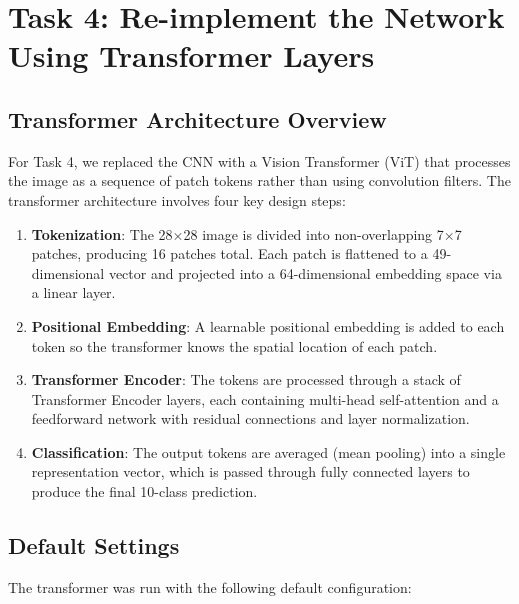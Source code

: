\documentclass[11pt]{article}
\begin{document}
\section{Task 4: Re-implement the Network Using Transformer Layers}


\subsection{Transformer Architecture Overview}

For Task 4, we replaced the CNN with a Vision Transformer (ViT) that processes the image as a sequence of patch tokens rather than using convolution filters. The transformer architecture involves four key design steps:

\begin{enumerate}
    \item \textbf{Tokenization}: The 28$\times$28 image is divided into non-overlapping 7$\times$7 patches, producing 16 patches total. Each patch is flattened to a 49-dimensional vector and projected into a 64-dimensional embedding space via a linear layer.
    
    \item \textbf{Positional Embedding}: A learnable positional embedding is added to each token so the transformer knows the spatial location of each patch.
    
    \item \textbf{Transformer Encoder}: The tokens are processed through a stack of Transformer Encoder layers, each containing multi-head self-attention and a feedforward network with residual connections and layer normalization.
    
    \item \textbf{Classification}: The output tokens are averaged (mean pooling) into a single representation vector, which is passed through fully connected layers to produce the final 10-class prediction.
\end{enumerate}

\subsection{Default Settings}

The transformer was run with the following default configuration:
\end{document}
